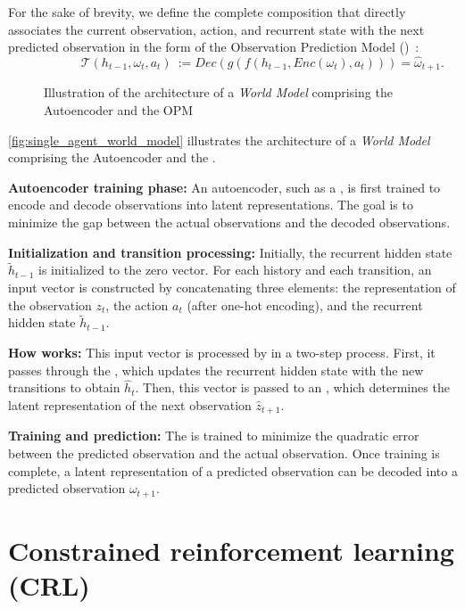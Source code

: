 For the sake of brevity, we define the complete composition that directly associates the current observation, action, and recurrent state with the next predicted observation in the form of the Observation Prediction Model ()~:
\[
  \hspace{2cm}\mathcal{T}(h_{t-1}, \omega_t, a_t)~:= Dec(g(f(h_{t-1}, Enc(\omega_t), a_t))) = \hat{\omega}_{t+1}.
\]

\begin{figure}[h!]
  \centering
  \resizebox{\textwidth}{!}{%
    
  }
  \caption{Illustration of the architecture of a \textit{World Model} comprising the Autoencoder and the OPM}
  \label{fig:single_agent_world_model}
\end{figure}

\autoref{fig:single_agent_world_model} illustrates the architecture of a \textit{World Model} comprising the Autoencoder and the .

\textbf{Autoencoder training phase:} An autoencoder, such as a , is first trained to encode and decode observations into latent representations. The goal is to minimize the gap between the actual observations and the decoded observations.

\textbf{Initialization and transition processing:} Initially, the recurrent hidden state $\tilde{h}_{t-1}$ is initialized to the zero vector. For each history and each transition, an input vector is constructed by concatenating three elements: the representation of the observation $z_t$, the action $a_t$ (after one-hot encoding), and the recurrent hidden state $\tilde{h}_{t-1}$.

\textbf{How  works:} This input vector is processed by  in a two-step process. First, it passes through the , which updates the recurrent hidden state with the new transitions to obtain $\hat{h}_t$. Then, this vector is passed to an , which determines the latent representation of the next observation $\hat{z}_{t+1}$.

\textbf{Training and prediction:} The  is trained to minimize the quadratic error between the predicted observation and the actual observation. Once training is complete, a latent representation of a predicted observation can be decoded into a predicted observation $\omega_{t+1}$.

\section{Constrained reinforcement learning (CRL)}


